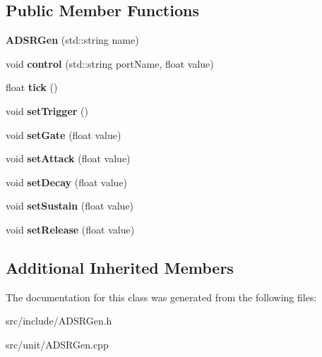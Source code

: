 \subsection*{Public Member Functions}
\begin{DoxyCompactItemize}
\item 
\hypertarget{classunit_1_1ADSRGen_a7e2d63eecbe51fc86a93697dd4d47964}{{\bfseries A\-D\-S\-R\-Gen} (std\-::string name)}\label{classunit_1_1ADSRGen_a7e2d63eecbe51fc86a93697dd4d47964}

\item 
\hypertarget{classunit_1_1ADSRGen_ac43bddd25b9a84f0ad6b299ed55f5133}{void {\bfseries control} (std\-::string port\-Name, float value)}\label{classunit_1_1ADSRGen_ac43bddd25b9a84f0ad6b299ed55f5133}

\item 
\hypertarget{classunit_1_1ADSRGen_a91a149fa5065d94dccec224b18710a24}{float {\bfseries tick} ()}\label{classunit_1_1ADSRGen_a91a149fa5065d94dccec224b18710a24}

\item 
\hypertarget{classunit_1_1ADSRGen_a8685be5cffea6ec29dc1ebdc44402f70}{void {\bfseries set\-Trigger} ()}\label{classunit_1_1ADSRGen_a8685be5cffea6ec29dc1ebdc44402f70}

\item 
\hypertarget{classunit_1_1ADSRGen_aee81e429433522eeb6362338fe15d551}{void {\bfseries set\-Gate} (float value)}\label{classunit_1_1ADSRGen_aee81e429433522eeb6362338fe15d551}

\item 
\hypertarget{classunit_1_1ADSRGen_a3a81f7181fa8b63f4ec5ff9da91cb8b3}{void {\bfseries set\-Attack} (float value)}\label{classunit_1_1ADSRGen_a3a81f7181fa8b63f4ec5ff9da91cb8b3}

\item 
\hypertarget{classunit_1_1ADSRGen_a14856bf0586881cbe088ab47918b7d72}{void {\bfseries set\-Decay} (float value)}\label{classunit_1_1ADSRGen_a14856bf0586881cbe088ab47918b7d72}

\item 
\hypertarget{classunit_1_1ADSRGen_a07fa6e650dc1ffdde91fc0721d4a8dc8}{void {\bfseries set\-Sustain} (float value)}\label{classunit_1_1ADSRGen_a07fa6e650dc1ffdde91fc0721d4a8dc8}

\item 
\hypertarget{classunit_1_1ADSRGen_a8c2a3e60dcae34d077b5983b1584de71}{void {\bfseries set\-Release} (float value)}\label{classunit_1_1ADSRGen_a8c2a3e60dcae34d077b5983b1584de71}

\end{DoxyCompactItemize}
\subsection*{Additional Inherited Members}


The documentation for this class was generated from the following files\-:\begin{DoxyCompactItemize}
\item 
src/include/A\-D\-S\-R\-Gen.\-h\item 
src/unit/A\-D\-S\-R\-Gen.\-cpp\end{DoxyCompactItemize}
